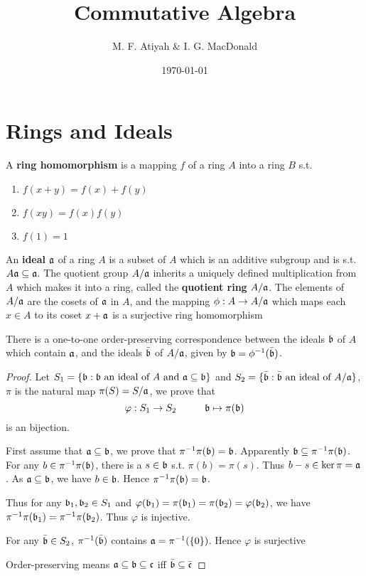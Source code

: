 \documentclass[11pt]{article}
\author{M. F. Atiyah \& I. G. MacDonald}
\date{\today}
\title{Commutative Algebra}
\begin{document}
\maketitle
\tableofcontents


\section{Rings and Ideals}
\label{sec:org7532261}
A \textbf{ring homomorphism} is a mapping \(f\) of a ring \(A\) into a ring \(B\) s.t.
\begin{enumerate}
\item \(f(x+y)=f(x)+f(y)\)
\item \(f(xy)=f(x)f(y)\)
\item \(f(1)=1\)
\end{enumerate}


An \textbf{ideal} \(\mathfrak{a}\) of a ring \(A\) is a subset of \(A\) which is an additive subgroup and is
s.t. \(A\mathfrak{a}\subseteq\mathfrak{a}\). The quotient group \(A/\mathfrak{a}\) inherits a uniquely defined multiplication from \(A\)
which makes it into a ring, called the \textbf{quotient ring} \(A/\mathfrak{a}\). The elements of \(A/\mathfrak{a}\) are the
cosets of \(\mathfrak{a}\) in \(A\), and the mapping \(\phi:A\to A/\mathfrak{a}\) which maps each \(x\in A\) to its
coset \(x+\mathfrak{a}\) is a surjective ring homomorphism

\begin{proposition}[]
\label{1.1}
There is a one-to-one order-preserving correspondence between the ideals \(\mathfrak{b}\) of \(A\) which
contain \(\mathfrak{a}\), and the ideals \(\bar{\mathfrak{b}}\) of \(A/\mathfrak{a}\), given by \(\mathfrak{b}=\phi^{-1}(\bar{\mathfrak{b}})\).
\end{proposition}

\begin{proof}
Let \(S_1=\{\mathfrak{b}:\mathfrak{b}\text{ an ideal of $A$ and }\mathfrak{a}\subseteq\mathfrak{b}\}\)
and \(S_2=\{\bar{\mathfrak{b}}:\bar{\mathfrak{b}}\text{ an ideal of }A/\mathfrak{a}\}\), \(\pi\) is the natural map \(\pi(S)=S/\mathfrak{a}\), we prove that
\begin{equation*}
\varphi:S_1\to S_2\hspace{1cm}\mathfrak{b}\mapsto\pi(\mathfrak{b})
\end{equation*}
is an bijection.

First assume that \(\mathfrak{a}\subseteq\mathfrak{b}\), we prove that \(\pi^{-1}\pi(\mathfrak{b})=\mathfrak{b}\). Apparently \(\mathfrak{b}\subseteq\pi^{-1}\pi(\mathfrak{b})\). For
any \(b\in\pi^{-1}\pi(\mathfrak{b})\), there is a \(s\in\mathfrak{b}\) s.t. \(\pi(b)=\pi(s)\). Thus \(b-s\in\ker\pi=\mathfrak{a}\). As \(\mathfrak{a}\subseteq\mathfrak{b}\),
we have \(b\in\mathfrak{b}\). Hence \(\pi^{-1}\pi(\mathfrak{b})=\mathfrak{b}\).

Thus for any \(\mathfrak{b}_1,\mathfrak{b}_2\in S_1\) and \(\varphi(\mathfrak{b}_1)=\pi(\mathfrak{b}_1)=\pi(\mathfrak{b}_2)=\varphi(\mathfrak{b}_2)\), we have \(\pi^{-1}\pi(\mathfrak{b}_1)=\pi^{-1}\pi(\mathfrak{b}_2)\).
Thus \(\varphi\) is injective.

For any \(\bar{\mathfrak{b}}\in S_2\), \(\pi^{-1}(\bar{\mathfrak{b}})\) contains \(\mathfrak{a}=\pi^{-1}(\{0\})\). Hence \(\varphi\) is surjective

Order-preserving means \(\mathfrak{a}\subseteq\mathfrak{b}\subseteq\mathfrak{c}\) iff \(\bar{\mathfrak{b}}\subseteq\bar{\mathfrak{c}}\)
\end{proof}
\end{document}
